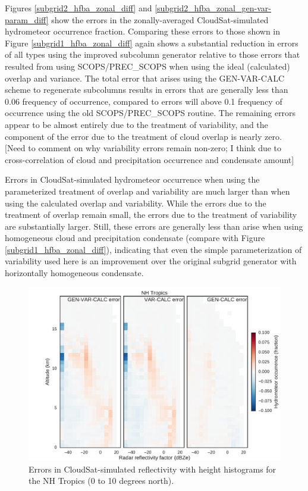 Figures \ref{subgrid2_hfba_zonal_diff} and \ref{subgrid2_hfba_zonal_gen-var-param_diff} show the errors in the zonally-averaged CloudSat-simulated hydrometeor occurrence fraction. Comparing these errors to those shown in Figure \ref{subgrid1_hfba_zonal_diff} again shows a substantial reduction in errors of all types using the improved subcolumn generator relative to those errors that resulted from using SCOPS/PREC\_SCOPS when using the ideal (calculated) overlap and variance. The total error that arises using the GEN-VAR-CALC scheme to regenerate subcolumns results in errors that are generally less than 0.06 frequency of occurrence, compared to errors will above 0.1 frequency of occurrence using the old SCOPS/PREC\_SCOPS routine. The remaining errors appear to be almost entirely due to the treatment of variability, and the component of the error due to the treatment of cloud overlap is nearly zero. [Need to comment on why variability errors remain non-zero; I think due to cross-correlation of cloud and precipitation occurrence and condensate amount]

Errors in CloudSat-simulated hydrometeor occurrence when using the parameterized treatment of overlap and variability are much larger than when using the calculated overlap and variability. While the errors due to the treatment of overlap remain small, the errors due to the treatment of variability are substantially larger. Still, these errors are generally less than arise when using homogeneous cloud and precipitation condensate (compare with Figure \ref{subgrid1_hfba_zonal_diff}), indicating that even the simple parameterization of variability used here is an improvement over the original subgrid generator with horizontally homogeneous condensate.

\begin{figure}
\centering
\includegraphics[width=\columnwidth]{graphics/subgrid2_cfadDbze94_NHTropics_gen-var-calc_diff.pdf}
\caption{Errors in CloudSat-simulated reflectivity with height histograms for the NH Tropics (0 to 10 degrees north).}
\label{subgrid2_cfadDbze94_nhtropics_diff}
\end{figure}

